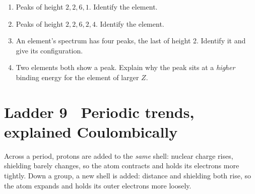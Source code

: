 \documentclass{apchem-worksheet}
\begin{document}
\begin{yourturn}
\begin{enumerate}[leftmargin=*,itemsep=0.5em]
  \item Peaks of height $2, 2, 6, 1$. Identify the element.
        \workspace[1.6cm]
  \item Peaks of height $2, 2, 6, 2, 4$. Identify the element.
        \workspace[1.6cm]
  \item An element's spectrum has four peaks, the last of height 2.
        Identify it and give its configuration. \workspace[1.8cm]
  \item Two elements both show a  peak. Explain why the peak sits
        at a \emph{higher} binding energy for the element of larger $Z$.
        \workspace[1.8cm]
\end{enumerate}
\end{yourturn}

\section*{\sffamily Ladder 9 \textbullet\ Periodic trends, explained Coulombically}

Across a period, protons are added to the \emph{same} shell: nuclear
charge rises, shielding barely changes, so the atom contracts and holds
its electrons more tightly. Down a group, a new shell is added: distance
and shielding both rise, so the atom expands and holds its outer electrons
more loosely.
\end{document}
